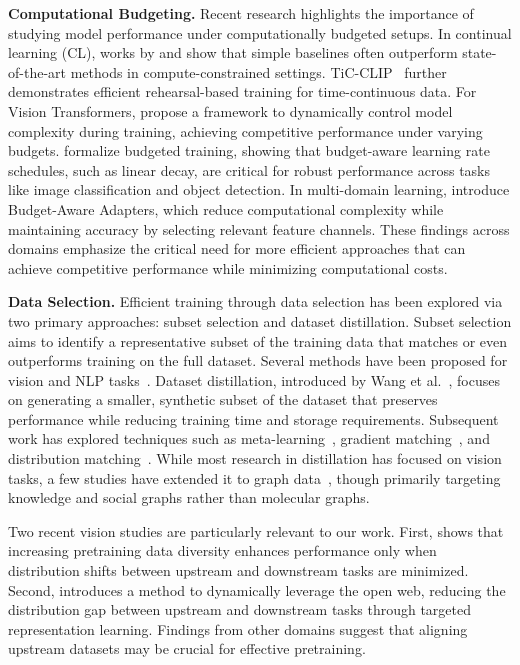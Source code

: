 \textbf{Computational Budgeting.} Recent research highlights the importance of studying model performance under computationally budgeted setups. In continual learning (CL), works by \citet{prabhu2023computationally} and \citet{ghunaim2023real} show that simple baselines often outperform state-of-the-art methods in compute-constrained settings. TiC-CLIP~\cite{tic-clip-v2} further demonstrates efficient rehearsal-based training for time-continuous data. For Vision Transformers, \citet{pan2022budgeted} propose a framework to dynamically control model complexity during training, achieving competitive performance under varying budgets. \citet{li2019budgeted} formalize budgeted training, showing that budget-aware learning rate schedules, such as linear decay, are critical for robust performance across tasks like image classification and object detection. In multi-domain learning, \citet{berriel2019budget} introduce Budget-Aware Adapters, which reduce computational complexity while maintaining accuracy by selecting relevant feature channels. These findings across domains emphasize the critical need for more efficient approaches that can achieve competitive performance while minimizing computational costs.

\textbf{Data Selection.} Efficient training through data selection has been explored via two primary approaches: subset selection and dataset distillation. Subset selection aims to identify a representative subset of the training data that matches or even outperforms training on the full dataset. Several methods have been proposed for vision and NLP tasks~\cite{attendu2023nlu, killamsetty2021grad, killamsetty2021glister, kaushal2019learning, bairi2015summarization, lapedriza2013all}. Dataset distillation, introduced by Wang et al.~\cite{wang2018dataset}, focuses on generating a smaller, synthetic subset of the dataset that preserves performance while reducing training time and storage requirements. Subsequent work has explored techniques such as meta-learning~\cite{zhou2022dataset, nguyendataset, nguyen2021dataset}, gradient matching~\cite{zhao2021dataset}, and distribution matching~\cite{zhao2023dataset}. While most research in distillation has focused on vision tasks, a few studies have extended it to graph data~\cite{jingraph, liu2022graph, jin2022condensing}, though primarily targeting knowledge and social graphs rather than molecular graphs.

Two recent vision studies are particularly relevant to our work. First, \citet{hammoud2024pretraining} shows that increasing pretraining data diversity enhances performance only when distribution shifts between upstream and downstream tasks are minimized. Second, \citet{li2023internet} introduces a method to dynamically leverage the open web, reducing the distribution gap between upstream and downstream tasks through targeted representation learning. Findings from other domains suggest that aligning upstream datasets may be crucial for effective pretraining.


